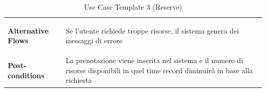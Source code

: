 \documentclass{article}
\begin{document}
\begin{table}
\begin{tabularx}{\textwidth}{|lX|}
                    \rowcolor{blue!10} \textbf{Alternative Flows} & \begin{description}[nosep,before=\leavevmode\vspace*{-1\baselineskip},after=\leavevmode\vspace*{-1\baselineskip}]
                                                                        \item [3a.] Se l'utente richiede troppe risorse, il sistema genera dei messaggi di errore 
                                                                    \end{description} \\
                    \rowcolor{white} \textbf{Post-conditions} & La prenotazione viene inserita nel sistema e il numero di risorse disponibili in quel time record diminuirà in base alla richiesta \\
                    \toprule
                \end{tabularx}
                \caption{Use Case Template 3 (Reserve)}
                \label{tab:use-case-template-3}
            \end{table}
\end{document}
